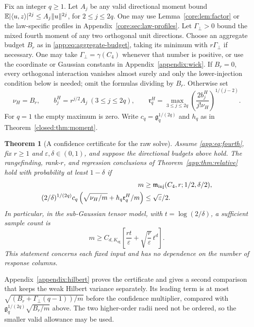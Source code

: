 \documentclass[11pt,a4paper]{article}
\newtheorem{theorem}{Theorem}[section]
\theoremstyle{definition}\newtheorem{definition}[theorem]{Definition}
\theoremstyle{remark}\newtheorem{remark}[theorem]{Remark}
\numberwithin{equation}{section}
\newcommand{\Ksg}{{K_{\mathrm{sg}}}}\newcommand{\Cfour}{{C_4}}
\newcommand{\gmom}{\mathfrak g}
\newcommand{\Rmom}{\mathfrak r}
\newcommand{\norm}[1]{\lVert#1\rVert}\newcommand{\ip}[2]{\langle#1,#2\rangle}
\begin{document}
Fix an integer $q\ge1$. Let $A_j$ be any valid directional moment bound
$\E|\ip u z|^{2j}\le A_j\norm u^{2j}$, for $2\le j\le2q$.
One may use Lemma~\ref{core:lem:factor} or the law-specific profiles
in Appendix~\ref{core:sec:law-profiles}. Let $\Gamma_{\perp}>0$ bound
the mixed fourth moment of any two orthogonal unit directions.
Choose an aggregate budget $B_r$ as in
\eqref{app:eq:aggregate-budget}, taking its minimum with $r\Gamma_{\perp}$
if necessary. One may take $\Gamma_{\perp}=\gamma(\Cfour)$ whenever that
number is positive, or use the coordinate or Gaussian constants in Appendix~\ref{appendix:wick}.
If $B_r=0$, every orthogonal interaction vanishes almost surely and
only the lower-injection condition below is needed; omit the formulas
dividing by $B_r$. Otherwise set
\begin{equation}\label{app:eq:hilbert-budgets}
 \nu_H=B_r,\qquad b_j^H=r^{j/2}A_j\ (3\le j\le2q),\qquad
 \Rmom_q^H=\max_{3\le j\le2q}
       \left(\frac{2b_j^H}{j!\nu_H}\right)^{1/(j-2)}.
\end{equation}
For $q=1$ the empty maximum is zero. Write $c_q=\gmom_q^{1/(2q)}$
and $h_q$ as in Theorem~\ref{closed:thm:moment}.

\begin{theorem}[A confidence certificate for the raw solve]
\label{app:thm:subgauss-confidence}
Assume \eqref{app:eq:fourth}, fix $r\ge1$ and $\varepsilon,\delta\in(0,1)$,
and suppose the directional budgets above hold. The rangefinding,
rank-$r$, and regression conclusions of Theorem~\ref{app:thm:relative}
hold with probability at least $1-\delta$ if
\begin{align}\label{app:eq:high-confidence}
 m&\ge\mathfrak m_{\rm inj}(\Cfour,r;1/2,\delta/2),\nonumber\\
 (2/\delta)^{1/(2q)}c_q
 \left(\sqrt{\nu_H/m}+h_q\Rmom_q^H/m\right)
 &\le\sqrt\varepsilon/2.
\end{align}
In particular, in the sub-Gaussian tensor model, with
$t=\log(2/\delta)$, a sufficient sample count is
\begin{equation}\label{app:eq:high-confidence-rate}
 m\ge C_{d,\Ksg}\left[
       \frac{rt}{\varepsilon}
       +\sqrt{\frac r\varepsilon}\,t^d\right].
\end{equation}
This statement concerns each fixed input and has no dependence on
the number of response columns.
\end{theorem}
Appendix~\ref{appendix:hilbert} proves the certificate and gives a
second comparison that keeps the weak Hilbert variance separately.
Its leading term is at most $\sqrt{(B_r+\Gamma_{\perp}(q-1))/m}$ before the
confidence multiplier, compared with
$\gmom_q^{1/(2q)}\sqrt{B_r/m}$ above. The two higher-order radii
need not be ordered, so the smaller valid allowance may be used.
\end{document}
